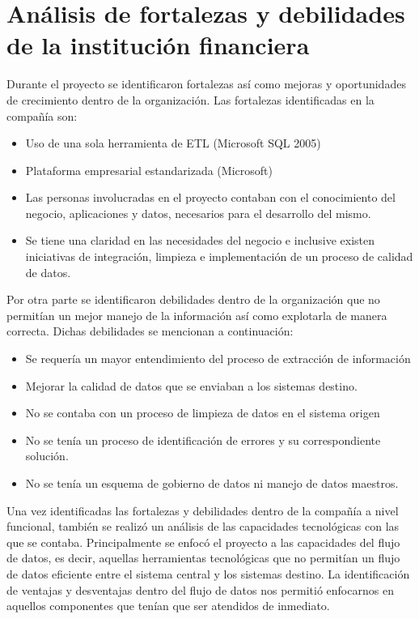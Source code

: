 \section{Análisis de fortalezas y debilidades de la institución financiera}

Durante el proyecto se identificaron fortalezas así como mejoras y oportunidades
de crecimiento dentro de la organización. Las fortalezas identificadas en la
compañía son:

\begin{itemize}
\item Uso de una sola herramienta de ETL (Microsoft SQL 2005)
\item Plataforma empresarial estandarizada (Microsoft)
\item Las personas involucradas en el proyecto contaban con el conocimiento del
  negocio, aplicaciones y datos, necesarios para el desarrollo del mismo.
\item Se tiene una claridad en las necesidades del negocio e inclusive existen
  iniciativas de integración, limpieza e implementación de un proceso de calidad
  de datos.
\end{itemize}

Por otra parte se identificaron debilidades dentro de la organización que no
permitían un mejor manejo de la información así como explotarla de manera
correcta. Dichas debilidades se mencionan a continuación:

\begin{itemize}
\item Se requería un mayor entendimiento del proceso de extracción de
  información
\item Mejorar la calidad de datos que se enviaban a los sistemas destino.
\item No se contaba con un proceso de limpieza de datos en el sistema origen
\item No se tenía un proceso de identificación de errores y su correspondiente
  solución.
\item No se tenía un esquema de gobierno de datos ni manejo de datos maestros.
\end{itemize}

Una vez identificadas las fortalezas y debilidades dentro de la compañía a nivel
funcional, también se realizó un análisis de las capacidades tecnológicas con
las que se contaba. Principalmente se enfocó el proyecto a las capacidades del
flujo de datos, es decir, aquellas herramientas tecnológicas que no permitían un
flujo de datos eficiente entre el sistema central y los sistemas destino. La
identificación de ventajas y desventajas dentro del flujo de datos nos permitió
enfocarnos en aquellos componentes que tenían que ser atendidos de inmediato.

